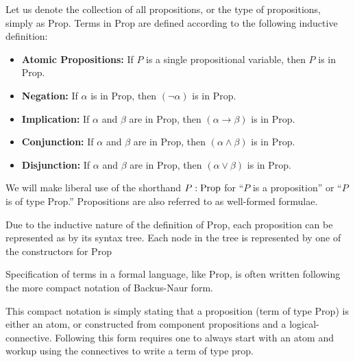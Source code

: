 \documentclass{book}
\begin{document}





Let us denote the collection of all propositions, or the type of propositions, simply as Prop. Terms in Prop are defined according to the following inductive definition: 

\begin{itemize}
    \item {\bf Atomic Propositions:} If $P$ is a single propositional variable, then $P$ is in Prop.
    \item {\bf Negation:} If $\alpha$ is in Prop, then $(\lnot\alpha)$ is in Prop. 
    \item {\bf Implication:} If $\alpha$ and $\beta$ are in Prop, then $(\alpha \to \beta)$ is in Prop.
    \item {\bf Conjunction:} If $\alpha$ and $\beta$ are in Prop, then $(\alpha \land \beta)$ is in Prop.
    \item {\bf Disjunction:} If $\alpha$ and $\beta$ are in Prop, then $(\alpha \lor \beta)$ is in Prop. 		
\end{itemize}

We will make liberal use of the shorthand $P : \text{Prop}$ for ``$P$ is a proposition'' or ``$P$ is of type Prop.'' Propositions are also referred to as well-formed formulae. 

Due to the inductive nature of the definition of Prop, each proposition can be represented as by its syntax tree. Each node in the tree is represented by one of the constructors for Prop



Specification of terms in a formal language, like Prop, is often written following the more compact notation of Backus-Naur form. 


This compact notation is simply stating that a proposition (term of type Prop) is either an atom, or constructed from component propositions and a logical-connective. Following this form requires one to always start with an atom and workup using the connectives to write a term of type prop. 
\end{document}
